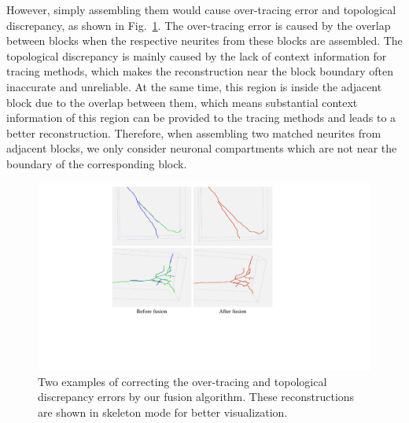 {However, simply assembling them would cause over-tracing error and topological discrepancy, as shown in Fig.~\ref{fig:overlap_discrepancy}.
%
The over-tracing error is caused by the overlap between blocks when the respective neurites from these blocks are assembled.
The topological discrepancy is mainly caused by the lack of context information for tracing methods, which makes the reconstruction near the block boundary often inaccurate and unreliable.
At the same time, this region is inside the adjacent block due to the overlap between them, which means substantial context information of this region can be provided to the tracing methods and leads to a better reconstruction.
Therefore, when assembling two matched neurites from adjacent blocks, we only consider neuronal compartments which are not near the boundary of the corresponding block. 

\begin{figure}[t]
	\centering
	\includegraphics[width=1\columnwidth]{./Illustrations/neuorns_fusion2.pdf}
	\caption{Two examples of correcting the over-tracing and topological discrepancy errors by our fusion algorithm. These reconstructions are shown in skeleton mode for better visualization.}
	\label{fig:overlap_discrepancy}
\end{figure}

}
